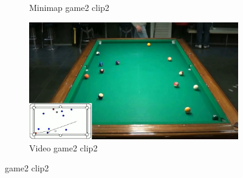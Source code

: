 \begin{figure}[H]
\begin{subfigure}[b]{0.48\textwidth}
    	\caption{Minimap game2 clip2}
    	\label{fig: game2_clip2_minimap}
    \end{subfigure}
    \begin{subfigure}[b]{0.48\textwidth}
    	\centering
    	\includegraphics[width=\textwidth]{images/Video/game2_clip2_video.jpg}
    	\caption{Video game2 clip2}
    	\label{fig: game2_clip2_video}
    \end{subfigure}

	\caption{game2 clip2}
\end{figure}

